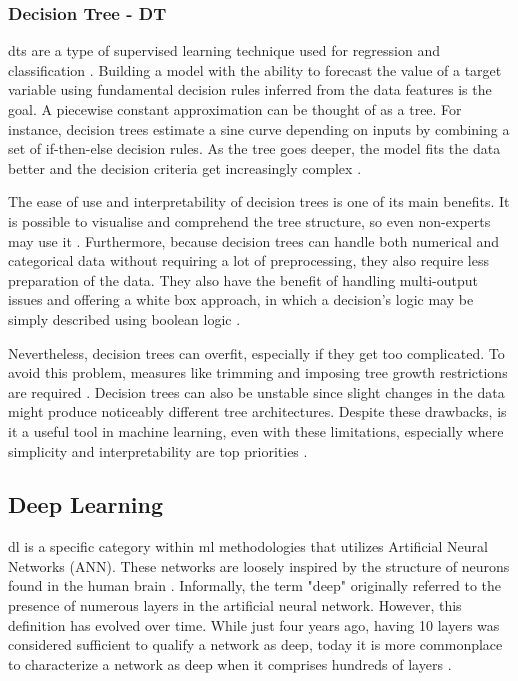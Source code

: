 \subsubsection{Decision Tree - DT}

\acfp{dt} are a type of supervised learning technique used for regression and classification \citep{sklearn_dtt}. Building a model with the ability to forecast the value of a target variable using fundamental decision rules inferred from the data features is the goal. A piecewise constant approximation can be thought of as a tree. For instance, decision trees estimate a sine curve depending on inputs by combining a set of if-then-else decision rules. As the tree goes deeper, the model fits the data better and the decision criteria get increasingly complex \citep{sklearn_dtt}.

The ease of use and interpretability of decision trees is one of its main benefits. It is possible to visualise and comprehend the tree structure, so even non-experts may use it \citep{sklearn_dtt}. Furthermore, because decision trees can handle both numerical and categorical data without requiring a lot of preprocessing, they also require less preparation of the data. They also have the benefit of handling multi-output issues and offering a white box approach, in which a decision's logic may be simply described using boolean logic \citep{sklearn_dtt}.

Nevertheless, decision trees can overfit, especially if they get too complicated. To avoid this problem, measures like trimming and imposing tree growth restrictions are required \citep{sklearn_dtt}. Decision trees can also be unstable since slight changes in the data might produce noticeably different tree architectures. Despite these drawbacks, is it a useful tool in machine learning, even with these limitations, especially where simplicity and interpretability are top priorities \citep{sklearn_dtt}.


\subsection{Deep Learning}
\ac{dl} is a specific category within \ac{ml} methodologies that utilizes Artificial Neural Networks (ANN). These networks are loosely inspired by the structure of neurons found in the human brain \citep{gulli_deep_2017}. Informally, the term "deep" originally referred to the presence of numerous layers in the artificial neural network. However, this definition has evolved over time. While just four years ago, having 10 layers was considered sufficient to qualify a network as deep, today it is more commonplace to characterize a network as deep when it comprises hundreds of layers \citep{gulli_deep_2017}. 

